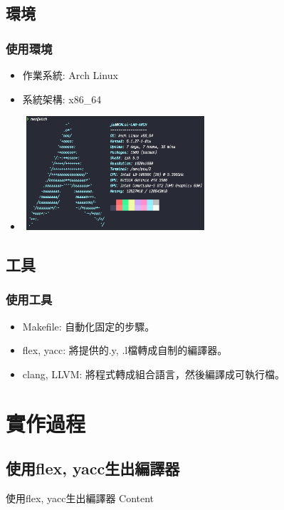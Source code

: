 \documentclass{beamer}
\begin{document}
\subsection{環境}
\begin{frame}
  \frametitle{使用環境}
  \begin{itemize}
    \item 作業系統: Arch Linux %
    \item 系統架構: x86\_64
    \item 
\includegraphics[width=260,height=160]{images/OS_INFO.png}
  \end{itemize}
\end{frame}

\subsection{工具}
\begin{frame}
  \frametitle{使用工具}
  \begin{itemize}
    \item Makefile: 自動化固定的步驟。
    \item flex, yacc: 將提供的.y, .l檔轉成自制的編譯器。
    \item clang, LLVM: 將程式轉成組合語言，然後編譯成可執行檔。
  \end{itemize}
\end{frame}

\section{實作過程}
\subsection{使用flex, yacc生出編譯器}
\begin{frame}{使用flex, yacc生出編譯器}
Content
\end{frame}
\end{document}
